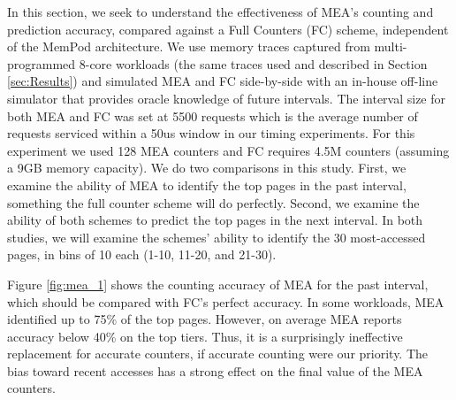 In this section, we seek to understand the effectiveness of MEA's counting 
and prediction accuracy, compared against a Full Counters (FC) scheme,
independent of the MemPod architecture. We use memory traces captured 
from multi-programmed 8-core workloads (the same traces used and described in Section \ref{sec:Results}) and simulated MEA and FC side-by-side with an in-house off-line simulator that provides oracle knowledge of future intervals. 
The interval size for both MEA and FC was set at 5500 requests which is the average number of requests serviced within a 50us window in our timing experiments. For this experiment we used 128 MEA counters and FC requires 4.5M counters (assuming a 9GB memory capacity). 
We do two comparisons in this study.  First, we examine the ability of MEA
to identify the top pages in the past interval, something the full counter
scheme will do perfectly.  Second, we examine the ability of both schemes
to predict the top pages in the next interval.  In both studies, we will
examine the schemes' ability to identify the 30 most-accessed pages, in
bins of 10 each (1-10, 11-20, and 21-30).


Figure \ref{fig:mea_1} shows the counting accuracy of MEA for the 
past interval, which should be compared with FC's perfect accuracy.
In some workloads, MEA identified up to 75\% of the top pages. 
However, on average MEA reports accuracy below 40\% on the top tiers. 
Thus, it is a surprisingly ineffective replacement for accurate counters,
if accurate counting were our priority.  The bias toward recent accesses
has a strong effect on the final value of the MEA counters.


